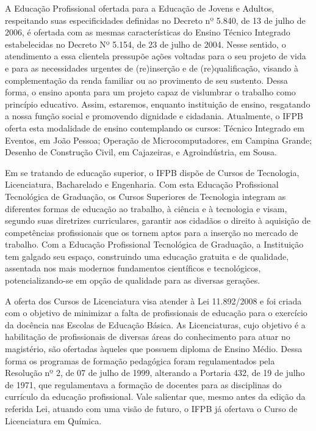	A Educação Profissional ofertada para a Educação de Jovens e Adultos, respeitando suas especificidades definidas no Decreto nº 5.840, de 13 de julho de 2006, é ofertada com as mesmas características do Ensino Técnico Integrado estabelecidas no Decreto Nº 5.154, de 23 de julho de 2004. Nesse sentido, o atendimento a essa clientela pressupõe ações voltadas para o seu projeto de vida e para as necessidades urgentes de (re)inserção e de (re)qualificação, visando à complementação da renda familiar ou ao provimento de seu sustento. Dessa forma, o ensino aponta para um projeto capaz de vislumbrar o trabalho como princípio educativo. Assim, estaremos, enquanto instituição de ensino, resgatando a nossa função social e promovendo dignidade e cidadania. Atualmente, o IFPB oferta esta modalidade de ensino contemplando os cursos: Técnico Integrado em Eventos, em João Pessoa; Operação de Microcomputadores, em Campina Grande; Desenho de Construção Civil, em Cajazeiras, e Agroindústria, em Sousa. 
	
	Em se tratando de educação superior, o IFPB dispõe de Cursos de Tecnologia, Licenciatura, Bacharelado e Engenharia. Com esta Educação Profissional Tecnológica de Graduação, os Cursos Superiores de Tecnologia integram as diferentes formas de educação ao trabalho, à ciência e à tecnologia e visam, segundo suas diretrizes curriculares, garantir aos cidadãos o direito à aquisição de competências profissionais que os tornem aptos para a inserção no mercado de trabalho. Com a Educação Profissional Tecnológica de Graduação, a Instituição tem galgado seu espaço, construindo uma educação gratuita e de qualidade, assentada nos mais modernos fundamentos científicos e tecnológicos, potencializando-se em opção de qualidade para as diversas gerações.

	A oferta dos Cursos de Licenciatura visa atender à Lei 11.892/2008 e foi criada com o objetivo de minimizar a falta de profissionais de educação para o exercício da docência nas Escolas de Educação Básica. As Licenciaturas, cujo objetivo é a habilitação de profissionais de diversas áreas do conhecimento para atuar no magistério, são ofertadas àqueles que possuem diploma de Ensino Médio. Dessa forma os programas de formação pedagógica foram regulamentados pela Resolução nº 2, de 07 de julho de 1999, alterando a Portaria 432, de 19 de julho de 1971, que regulamentava a formação de docentes para as disciplinas do currículo da educação profissional. Vale salientar que, mesmo antes da edição da referida Lei, atuando com uma visão de futuro, o IFPB já ofertava o Curso de Licenciatura em Química.
	
